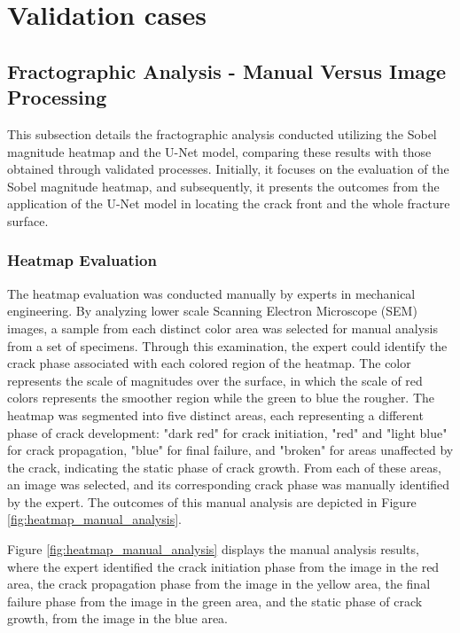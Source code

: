 \documentclass{ieeeaccess}
\begin{document}
\section{Validation cases}
\label{Sec: Validation cases}

\subsection{Fractographic Analysis - Manual Versus Image Processing}
\label{Subsec: Experimental Results}

This subsection details the fractographic analysis conducted utilizing the Sobel magnitude heatmap and the U-Net model, comparing these results with those obtained through validated processes.
Initially, it focuses on the evaluation of the Sobel magnitude heatmap, and subsequently, it presents the outcomes from the application of the U-Net model in locating the crack front and the whole fracture surface.

\subsubsection{Heatmap Evaluation}
\label{Subsubsec: Heatmap Evaluation}
The heatmap evaluation was conducted manually by experts in mechanical engineering.
By analyzing lower scale Scanning Electron Microscope (SEM) images, a sample from each distinct color area was selected for manual analysis from a set of specimens. Through this examination, the expert could identify the crack phase associated with each colored region of the heatmap. The color represents the scale of magnitudes over the surface, in which the scale of red colors represents the smoother region while the green to blue the rougher.  
The heatmap was segmented into five distinct areas, each representing a different phase of crack development: "dark red" for crack initiation, "red" and "light blue" for crack propagation, "blue" for final failure, and "broken" for areas unaffected by the crack, indicating the static phase of crack growth. From each of these areas, an image was selected, and its corresponding crack phase was manually identified by the expert. The outcomes of this manual analysis are depicted in Figure \ref{fig:heatmap_manual_analysis}.

Figure \ref{fig:heatmap_manual_analysis} displays the manual analysis results,
where the expert identified the crack initiation phase from the image in the red area,
the crack propagation phase from the image in the yellow area,
the final failure phase from the image in the green area, and the static phase of crack growth,
from the image in the blue area.
\end{document}

